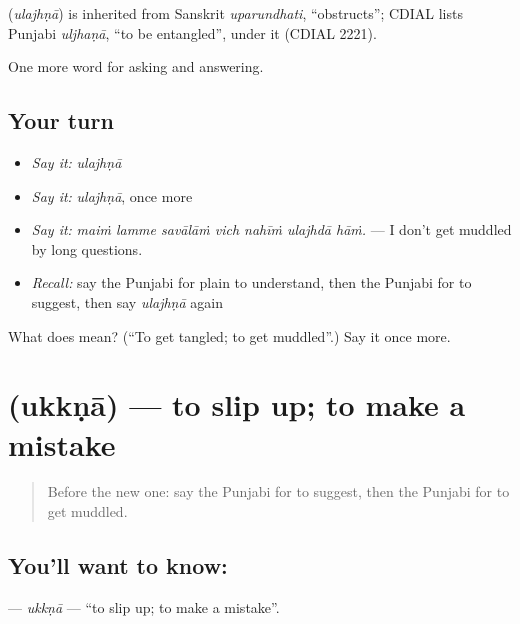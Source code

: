 \begin{cousinweb}
\textbf{} (\emph{ulajhṇā}) is inherited from Sanskrit \emph{uparundhati}, \textquotedblleft{}obstructs\textquotedblright{}; CDIAL lists Punjabi \emph{uljhaṇā}, \textquotedblleft{}to be entangled\textquotedblright{}, under it (CDIAL 2221).
\end{cousinweb}

\begin{grammarlens}[title={What you've built}]
One more word for asking and answering.
\end{grammarlens}

\subsection*{Your turn}
\begin{itemize}
\raggedright
  \item \emph{Say it:} \emph{ulajhṇā}
  \item \emph{Say it:} \emph{ulajhṇā}, once more
  \item \emph{Say it:} \emph{maiṁ lamme savālāṁ vich nahīṁ ulajhdā hāṁ.} — I don't get muddled by long questions.
  \item \emph{Recall:} say the Punjabi for plain to understand, then the Punjabi for to suggest, then say \emph{ulajhṇā} again
\end{itemize}

\begin{tcolorbox}[breakable,colback=teal!4,colframe=teal!35!black,title={Before you move on}]
What does  mean? (\textquotedblleft{}To get tangled; to get muddled\textquotedblright{}.) Say it once more.
\end{tcolorbox}
\section[\texorpdfstring{\pa{ਉੱਕਣਾ} (ukkṇā)}{ਉੱਕਣਾ (ukkṇā)}]{ (ukkṇā) — to slip up; to make a mistake}

\label{lesson:PA-C343-ukkna}



\begin{quote}
Before the new one: say the Punjabi for to suggest, then the Punjabi for to get muddled.
\end{quote}

\subsection*{You'll want to know: }
\textbf{} — \emph{ukkṇā} — \textquotedblleft{}to slip up; to make a mistake\textquotedblright{}.

